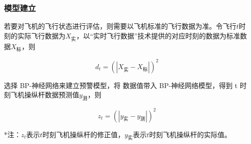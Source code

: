 \documentclass[UTF8]{ctexart}
\begin{document}
\subsubsection{模型建立}
若要对飞机的飞行状态进行评估，则需要以飞机标准的飞行数据为准。令飞行$t$时刻的实际飞行数据为$X_{\text{实}}$，以“实时飞行数据”技术提供的对应时刻的数据为标准数据$X_{\text{标}}$，则  \par
\begin{equation}
d_t=\left( \left| X_{\text{实}}-X_{\text{标}} \right| \right) ^2
\end{equation}\par
选择 BP-神经网络来建立预警模型，将 数据值带入 BP-神经网络模型，得到 t
时刻飞机操纵杆数据预测值$y_{\text{测}}$，则 \par
\begin{equation}
	z_t=\left( \left| y_{\text{实}}-y_{\text{测}} \right| \right) ^2
\end{equation}\par
*注：$z_t$表示$t$时刻飞机操纵杆的修正值，$y_{\text{实}}$表示$t$时刻飞机操纵杆的实际值。\par
\end{document}
